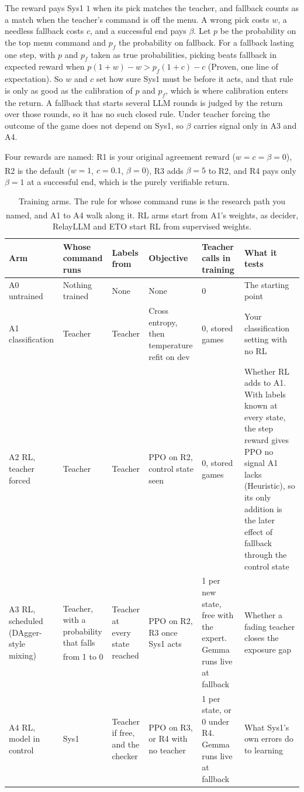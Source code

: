 \documentclass[10pt]{article}
\newcommand{\my}{\textsuperscript{\textcolor{blue!70!black}{\dag}}}
\begin{document}
The reward pays Sys1 $1$ when its pick matches the teacher, and fallback counts as a match when the teacher's command is off the menu. A wrong pick costs $w$, a needless fallback costs $c$, and a successful end pays $\beta$. Let $p$ be the probability on the top menu command and $p_f$ the probability on fallback. For a fallback lasting one step, with $p$ and $p_f$ taken as true probabilities, picking beats fallback in expected reward when $p(1+w)-w > p_f(1+c)-c$ (Proven, one line of expectation). So $w$ and $c$ set how sure Sys1 must be before it acts, and that rule is only as good as the calibration of $p$ and $p_f$, which is where calibration enters the return. A fallback that starts several LLM rounds is judged by the return over those rounds, so it has no such closed rule. Under teacher forcing the outcome of the game does not depend on Sys1, so $\beta$ carries signal only in A3 and A4.

Four rewards are named: R1 is your original agreement reward ($w=c=\beta=0$), R2 is the default ($w=1$, $c=0.1$, $\beta=0$)\my, R3 adds $\beta=5$\my{} to R2, and R4 pays only $\beta=1$ at a successful end, which is the purely verifiable return.

\begin{table}[H]
\footnotesize
\caption{Training arms. The rule for whose command runs is the research path you named, and A1 to A4 walk along it. RL arms start from A1's weights\my, as decider, RelayLLM and ETO start RL from supervised weights.}
\label{t:arms}
\begin{tabularx}{\linewidth}{@{}P{3.6cm} P{3.5cm} P{3cm} P{4.2cm} P{3.2cm} L@{}}
\toprule
Arm & Whose command runs & Labels from & Objective & Teacher calls in training & What it tests \\
\midrule
A0 untrained & Nothing trained & None & None & 0 & The starting point \\
A1 classification & Teacher & Teacher & Cross entropy, then temperature refit on dev & 0, stored games & Your classification setting with no RL \\
A2 RL, teacher forced & Teacher & Teacher & PPO on R2, control state seen & 0, stored games & Whether RL adds to A1. With labels known at every state, the step reward gives PPO no signal A1 lacks (Heuristic), so its only addition is the later effect of fallback through the control state \\
A3 RL, scheduled (DAgger-style mixing) & Teacher, with a probability that falls from 1 to 0\my & Teacher at every state reached & PPO on R2, R3 once Sys1 acts & 1 per new state, free with the expert. Gemma runs live at fallback & Whether a fading teacher closes the exposure gap \\
A4 RL, model in control & Sys1 & Teacher if free, and the checker & PPO on R3, or R4 with no teacher & 1 per state, or 0 under R4. Gemma runs live at fallback & What Sys1's own errors do to learning \\
\bottomrule
\end{tabularx}
\end{table}
\end{document}

